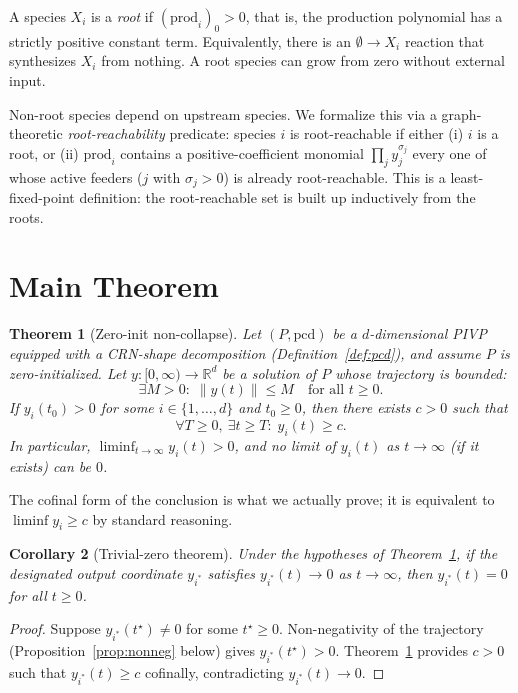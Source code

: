 \documentclass[11pt]{article}
\newtheorem{theorem}{Theorem}
\newtheorem{corollary}[theorem]{Corollary}
\newcommand{\R}{\mathbb{R}}
\newcommand{\prodpoly}{\mathrm{prod}}
\begin{document}
A species $X_i$ is a \emph{root} if $(\prodpoly_i)_0 > 0$, that is, the
production polynomial has a strictly positive constant term. Equivalently,
there is an $\emptyset \to X_i$ reaction that synthesizes $X_i$ from nothing.
A root species can grow from zero without external input.

Non-root species depend on upstream species. We formalize this via a
graph-theoretic \emph{root-reachability} predicate: species $i$ is
root-reachable if either (i) $i$ is a root, or (ii) $\prodpoly_i$ contains a
positive-coefficient monomial $\prod_j y_j^{\sigma_j}$ every one of whose
active feeders ($j$ with $\sigma_j > 0$) is already root-reachable. This is a
least-fixed-point definition: the root-reachable set is built up inductively
from the roots.

\section{Main Theorem}

\begin{theorem}[Zero-init non-collapse]\label{thm:main}
Let $(P, \mathrm{pcd})$ be a $d$-dimensional PIVP equipped with a CRN-shape
decomposition (Definition~\ref{def:pcd}), and assume $P$ is zero-initialized.
Let $y \colon [0, \infty) \to \R^d$ be a solution of $P$ whose trajectory is
bounded:
\[
  \exists M > 0 : \; \|y(t)\| \le M \quad \text{for all } t \ge 0.
\]
If $y_i(t_0) > 0$ for some $i \in \{1, \ldots, d\}$ and $t_0 \ge 0$, then
there exists $c > 0$ such that
\[
  \forall T \ge 0,\ \exists t \ge T : \; y_i(t) \ge c.
\]
In particular, $\liminf_{t \to \infty} y_i(t) > 0$, and no limit of
$y_i(t)$ as $t \to \infty$ (if it exists) can be $0$.
\end{theorem}

The cofinal form of the conclusion is what we actually prove; it is
equivalent to $\liminf y_i \ge c$ by standard reasoning.

\begin{corollary}[Trivial-zero theorem]\label{cor:trivial-zero}
Under the hypotheses of Theorem~\ref{thm:main}, if the designated output
coordinate $y_{i^\ast}$ satisfies $y_{i^\ast}(t) \to 0$ as $t \to \infty$,
then $y_{i^\ast}(t) = 0$ for all $t \ge 0$.
\end{corollary}

\begin{proof}
Suppose $y_{i^\ast}(t^\star) \ne 0$ for some $t^\star \ge 0$. Non-negativity
of the trajectory (Proposition~\ref{prop:nonneg} below) gives
$y_{i^\ast}(t^\star) > 0$. Theorem~\ref{thm:main} provides $c > 0$ such that
$y_{i^\ast}(t) \ge c$ cofinally, contradicting $y_{i^\ast}(t) \to 0$.
\end{proof}
\end{document}
